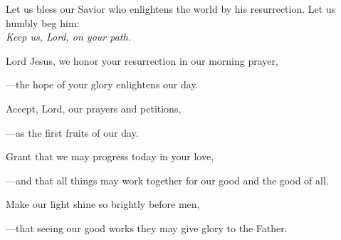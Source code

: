 \intercessions\indent

\begin{hangpar}

Let us bless our Savior who enlightens the world by his resurrection. Let us humbly beg him:\\
\emph{Keep us, Lord, on your path.}

\medskip Lord Jesus, we honor your resurrection in our morning prayer,

{\color{red}---\thinspace}the hope of your glory enlightens our day.

\medskip Accept, Lord, our prayers and petitions,

{\color{red}---\thinspace}as the first fruits of our day.

\medskip Grant that we may progress today in your love,

{\color{red}---\thinspace}and that all things may work together for our good and the good of all.

\medskip Make our light shine so brightly before men,

{\color{red}---\thinspace}that seeing our good works they may give glory to the Father.

\end{hangpar}

